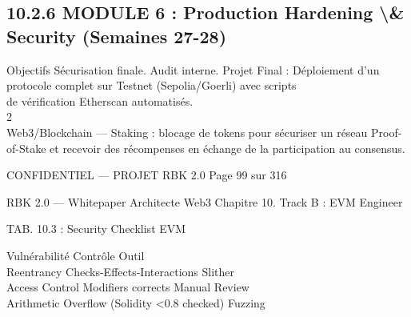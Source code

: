 \subsection{10.2.6 MODULE 6 : Production Hardening \textbackslash{}& Security (Semaines 27-28)}
Objectifs Sécurisation finale. Audit interne. Projet Final : Déploiement d’un protocole complet sur Testnet (Sepolia/Goerli) avec scripts\\
de vérification Etherscan automatisés.\\
2\\
Web3/Blockchain — Staking : blocage de tokens pour sécuriser un réseau Proof-of-Stake et recevoir des récompenses en échange de la participation au consensus.\\
\vspace{0.5em}
\vspace{0.5em}
\vspace{0.5em}
\vspace{0.5em}
\begin{confidential}CONFIDENTIEL — PROJET RBK 2.0                                             Page 99 sur 316\end{confidential}
RBK 2.0 — Whitepaper Architecte Web3                                                                   Chapitre 10. Track B : EVM Engineer\\
\vspace{0.5em}
\vspace{0.5em}
\begin{center}\begin{tabular}TAB. 10.3 : Security Checklist EVM\end{tabular}\end{center}
\vspace{0.5em}
\vspace{0.5em}
Vulnérabilité Contrôle                          Outil\\
Reentrancy     Checks-Effects-Interactions      Slither\\
Access Control Modifiers corrects               Manual Review\\
Arithmetic     Overflow (Solidity \textless{}0.8 checked) Fuzzing\\
\vspace{0.5em}
\vspace{0.5em}
\vspace{0.5em}
\vspace{0.5em}
